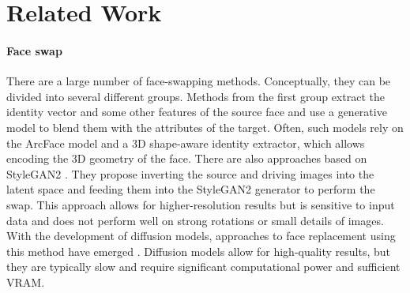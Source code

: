 \section{Related Work}
\paragraph{Face swap}
There are a large number of face-swapping methods. Conceptually, they can be divided into several different groups. Methods from the first group \cite{simswap2020, hififace2021, ghost2022} extract the identity vector and some other features of the source face and use a generative model to blend them with the attributes of the target. Often, such models rely on the ArcFace \cite{deng2019arcface} model and a 3D shape-aware identity extractor, which allows encoding the 3D geometry of the face.
There are also approaches \cite{zhu2021megafs} based on StyleGAN2 \cite{Karras2019stylegan2}. They propose inverting the source and driving images into the latent space and feeding them into the StyleGAN2 generator to perform the swap. This approach allows for higher-resolution results but is sensitive to input data and does not perform well on strong rotations or small details of images.
With the development of diffusion models, approaches to face replacement using this method have emerged \cite{zhao2023diffswap, chen2024hifivfshighfidelityvideo}. Diffusion models allow for high-quality results, but they are typically slow and require significant computational power and sufficient VRAM.

